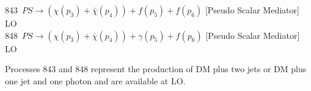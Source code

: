 843~$PS\to({\chi}(p_3)+\bar{\chi}(p_4)) +f(p_5)+f(p_6)$ [Pseudo Scalar Mediator]   LO \\
848~$PS\to({\chi}(p_3)+\bar{\chi}(p_4)) +\gamma(p_5)+f(p_6)$ [Pseudo Scalar Mediator]   LO

Processes 843 and 848 represent the production of DM plus two jets or
DM plus one jet and one photon and are available at LO.

